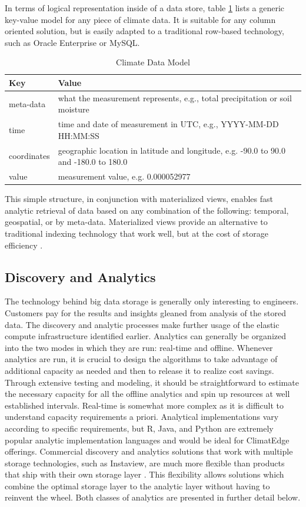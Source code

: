 In terms of logical representation inside of a data store, table \ref{model} lists a generic key-value model for any piece of climate data. It is suitable for any column oriented solution, but is easily adapted to a traditional row-based technology, such as Oracle Enterprise or MySQL.
\begin{table}[htbp]
    \centering
    \begin{tabular}{l l}
        \hline
	Key & Value \\ [0.5ex]
	\hline
	meta-data & what the measurement represents, e.g., total precipitation or soil moisture\\
	time & time and date of measurement in UTC, e.g., YYYY-MM-DD HH:MM:SS\\
	coordinates & geographic location in latitude and longitude, e.g. -90.0 to 90.0 and -180.0 to 180.0\\
	value & measurement value, e.g. 0.000052977\\
	\hline
    \end{tabular}
    \caption{Climate Data Model}
    \label{model}
\end{table}
This simple structure, in conjunction with materialized views, enables fast analytic retrieval of data based on any combination of the following: temporal, geospatial, or by meta-data. Materialized views provide an alternative to traditional indexing technology that work well, but at the cost of storage efficiency \cite{materialized_views}. 
\subsection{Discovery and Analytics}
The technology behind big data storage is generally only interesting to engineers. Customers pay for the results and insights gleaned from analysis of the stored data. The discovery and analytic processes make further usage of the elastic compute infrastructure identified earlier. Analytics can generally be organized into the two modes in which they are run: real-time and offline. Whenever analytics are run, it is crucial to design the algorithms to take advantage of additional capacity as needed and then to release it to realize cost savings. Through extensive testing and modeling, it should be straightforward to estimate the necessary capacity for all the offline analytics and spin up resources at well established intervals. Real-time is somewhat more complex as it is difficult to understand capacity requirements a priori. Analytical implementations vary according to specific requirements, but R, Java, and Python are extremely popular analytic implementation languages and would be ideal for ClimatEdge offerings. Commercial discovery and analytics solutions that work with multiple storage technologies, such as Instaview, are much more flexible than products that ship with their own storage layer \cite{pentaho}. This flexibility allows solutions which combine the optimal storage layer to the analytic layer without having to reinvent the wheel. Both classes of analytics are presented in further detail below.
